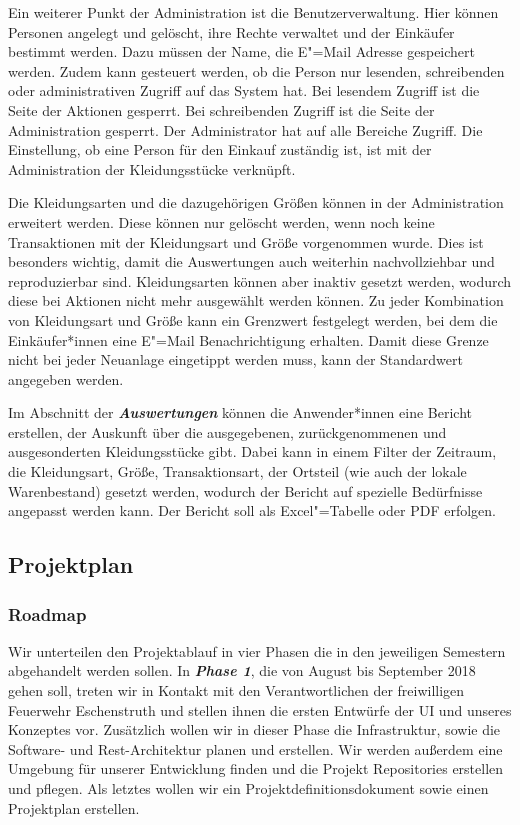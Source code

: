 Ein weiterer Punkt der Administration ist die Benutzerverwaltung. Hier können Personen angelegt und gelöscht, ihre Rechte verwaltet und der Einkäufer bestimmt werden. Dazu müssen der Name, die E"=Mail Adresse gespeichert werden. Zudem kann gesteuert werden, ob die Person nur lesenden, schreibenden oder administrativen Zugriff auf das System hat. Bei lesendem Zugriff ist die Seite der Aktionen gesperrt. Bei schreibenden Zugriff ist die Seite der Administration gesperrt. Der Administrator hat auf alle Bereiche Zugriff. Die Einstellung, ob eine Person für den Einkauf zuständig ist, ist mit der Administration der Kleidungsstücke verknüpft. 

Die Kleidungsarten und die dazugehörigen Größen können in der Administration erweitert werden. Diese können nur gelöscht werden, wenn noch keine Transaktionen mit der Kleidungsart und Größe vorgenommen wurde. Dies ist besonders wichtig, damit die Auswertungen auch weiterhin nachvollziehbar und reproduzierbar sind. Kleidungsarten können aber inaktiv gesetzt werden, wodurch diese bei Aktionen nicht mehr ausgewählt werden können. Zu jeder Kombination von Kleidungsart und Größe kann ein Grenzwert festgelegt werden, bei dem die Einkäufer*innen eine E"=Mail Benachrichtigung erhalten. Damit diese Grenze nicht bei jeder Neuanlage eingetippt werden muss, kann der Standardwert angegeben werden.

Im Abschnitt der \textit{\textbf{Auswertungen}} können die Anwender*innen eine Bericht erstellen, der Auskunft über die ausgegebenen, zurückgenommenen und ausgesonderten Kleidungsstücke gibt. Dabei kann in einem Filter der Zeitraum, die Kleidungsart, Größe, Transaktionsart, der Ortsteil (wie auch der lokale Warenbestand) gesetzt werden, wodurch der Bericht auf spezielle Bedürfnisse angepasst werden kann. Der Bericht soll als Excel"=Tabelle oder PDF erfolgen.

\subsection{Projektplan}
\subsubsection{Roadmap}\label{sec:roadmap}

Wir unterteilen den Projektablauf in vier Phasen die in den jeweiligen Semestern abgehandelt werden sollen. In \textit{\textbf{Phase 1}}, die von August bis September 2018 gehen soll, treten wir in Kontakt mit den Verantwortlichen der freiwilligen Feuerwehr Eschenstruth und stellen ihnen die ersten Entwürfe der UI und unseres Konzeptes vor.
Zusätzlich wollen wir in dieser Phase die Infrastruktur, sowie die Software- und Rest-Architektur planen und erstellen. Wir werden außerdem eine Umgebung für unserer Entwicklung finden und die Projekt Repositories erstellen und pflegen.
Als letztes wollen wir ein Projektdefinitionsdokument sowie einen Projektplan erstellen.

